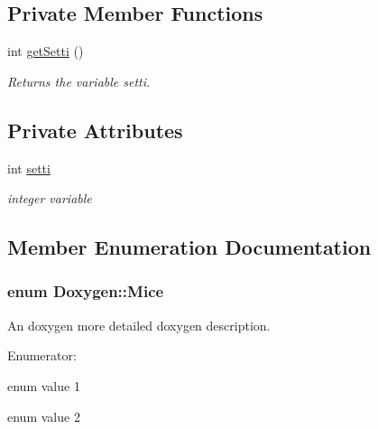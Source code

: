\subsection*{Private Member Functions}
\begin{DoxyCompactItemize}
\item 
int \hyperlink{classDoxygen_a9ac38fe06a32e600b04fbd66a99a81f3}{get\-Setti} ()
\begin{DoxyCompactList}\small\item\em Returns the variable setti. \end{DoxyCompactList}\end{DoxyCompactItemize}
\subsection*{Private Attributes}
\begin{DoxyCompactItemize}
\item 
\hypertarget{classDoxygen_afa8d33dba539aae9b47b5d644bf62487}{int \hyperlink{classDoxygen_afa8d33dba539aae9b47b5d644bf62487}{setti}}\label{classDoxygen_afa8d33dba539aae9b47b5d644bf62487}

\begin{DoxyCompactList}\small\item\em integer variable \end{DoxyCompactList}\end{DoxyCompactItemize}


\subsection{Member Enumeration Documentation}
\hypertarget{classDoxygen_aa357d9d47e3f1d78d20029894f927379}{
\subsubsection[{Mice}]{\setlength{\rightskip}{0pt plus 5cm}enum {\bf Doxygen\-::\-Mice}}}\label{classDoxygen_aa357d9d47e3f1d78d20029894f927379}


An doxygen more detailed doxygen description. 

\begin{Desc}
\item[Enumerator\-: ]\par
\begin{description}
\item[{\em 
\hypertarget{classDoxygen_aa357d9d47e3f1d78d20029894f927379a9d6156a0661afa9b73da2cdd97ca5e71}{mouse}\label{classDoxygen_aa357d9d47e3f1d78d20029894f927379a9d6156a0661afa9b73da2cdd97ca5e71}
}]enum value 1 \item[{\em 
\hypertarget{classDoxygen_aa357d9d47e3f1d78d20029894f927379a6c89fd478d71f650e90e79313744a22a}{mouse2}\label{classDoxygen_aa357d9d47e3f1d78d20029894f927379a6c89fd478d71f650e90e79313744a22a}
}]enum value 2 \end{description}
\end{Desc}


